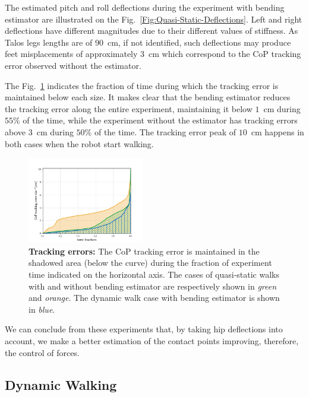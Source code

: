 \documentclass[letterpaper, 10 pt, conference]{ieeeconf}  %
\begin{document}
    The estimated pitch and roll deflections during the experiment with bending estimator are illustrated on the Fig.~\ref{Fig:Quasi-Static-Deflections}. Left and right deflections have different magnitudes due to their different values of stiffness. As Talos legs lengths are of $90$~cm, if not identified, such deflections may produce feet misplacements of approximately $3$~cm which correspond to the CoP tracking error observed without the estimator.

   
    The Fig.~\ref{Fig:Quasi-Static-TrackingError} indicates the fraction of time during which the tracking error is maintained below each size. It makes clear that the bending estimator reduces the tracking error along the entire experiment, maintaining it below $1$~cm during $55$\% of the time, while the experiment without the estimator has tracking errors above $3$~cm during $50$\% of the time. The tracking error peak of $10$~cm happens in both cases when the robot start walking.

\begin{figure}
	\centering
	\includegraphics[trim={0 1mm 0 3mm},clip,width=0.45\textwidth]{images/quasisteticTR.png}
	\caption{\textbf{Tracking errors:} The CoP tracking error is maintained in the shadowed area (below the curve) during the fraction of experiment time indicated on the horizontal axis. The cases of quasi-static walks with and without bending estimator are respectively shown in \textit{green} and \textit{orange}. The dynamic walk case with bending estimator is shown in \textit{blue}.}
	\label{Fig:Quasi-Static-TrackingError}
\end{figure} 
 
    We can conclude from these experiments that, by taking hip deflections into account, we make a better estimation of the contact points improving, therefore, the control of forces.
    
\subsection{Dynamic Walking}
\end{document}
